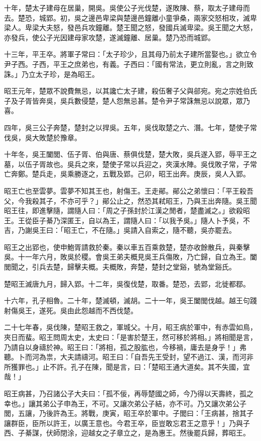 \begin{pinyinscope}
十年，楚太子建母在居巢，開吳。吳使公子光伐楚，遂敗陳、蔡，取太子建母而去。楚恐，城郢。初，吳之邊邑卑梁與楚邊邑鐘離小童爭桑，兩家交怒相攻，滅卑梁人。卑梁大夫怒，發邑兵攻鐘離。楚王聞之怒，發國兵滅卑梁。吳王聞之大怒，亦發兵，使公子光因建母家攻楚，遂滅鐘離、居巢。楚乃恐而城郢。

十三年，平王卒。將軍子常曰：「太子珍少，且其母乃前太子建所當娶也。」欲立令尹子西。子西，平王之庶弟也，有義。子西曰：「國有常法，更立則亂，言之則致誅。」乃立太子珍，是為昭王。

昭王元年，楚眾不說費無忌，以其讒亡太子建，殺伍奢子父與郤宛。宛之宗姓伯氏子及子胥皆奔吳，吳兵數侵楚，楚人怨無忌甚。楚令尹子常誅無忌以說眾，眾乃喜。

四年，吳三公子奔楚，楚封之以捍吳。五年，吳伐取楚之六、潛。七年，楚使子常伐吳，吳大敗楚於豫章。

十年冬，吳王闔閭、伍子胥、伯與唐、蔡俱伐楚，楚大敗，吳兵遂入郢，辱平王之墓，以伍子胥故也。吳兵之來，楚使子常以兵迎之，夾漢水陣。吳伐敗子常，子常亡奔鄭。楚兵走，吳乘勝逐之，五戰及郢。己卯，昭王出奔。庚辰，吳人入郢。

昭王亡也至雲夢。雲夢不知其王也，射傷王。王走鄖。鄖公之弟懷曰：「平王殺吾父，今我殺其子，不亦可乎？」鄖公止之，然恐其弒昭王，乃與王出奔隨。吳王聞昭王往，即進擊隨，謂隨人曰：「周之子孫封於江漢之閒者，楚盡滅之。」欲殺昭王。王從臣子綦乃深匿王，自以為王，謂隨人曰：「以我予吳。」隨人卜予吳，不吉，乃謝吳王曰：「昭王亡，不在隨。」吳請入自索之，隨不聽，吳亦罷去。

昭王之出郢也，使申鮑胥請救於秦。秦以車五百乘救楚，楚亦收餘散兵，與秦擊吳。十一年六月，敗吳於稷。會吳王弟夫概見吳王兵傷敗，乃亡歸，自立為王。闔閭聞之，引兵去楚，歸擊夫概。夫概敗，奔楚，楚封之堂谿，號為堂谿氏。

楚昭王滅唐九月，歸入郢。十二年，吳復伐楚，取番。楚恐，去郢，北徙都鄀。

十六年，孔子相魯。二十年，楚滅頓，滅胡。二十一年，吳王闔閭伐越。越王句踐射傷吳王，遂死。吳由此怨越而不西伐楚。

二十七年春，吳伐陳，楚昭王救之，軍城父。十月，昭王病於軍中，有赤雲如鳥，夾日而蜚。昭王問周太史，太史曰：「是害於楚王，然可移於將相。」將相聞是言，乃請自以身禱於神。昭王曰：「將相，孤之股肱也，今移禍，庸去是身乎！」弗聽。卜而河為祟，大夫請禱河。昭王曰：「自吾先王受封，望不過江、漢，而河非所獲罪也。」止不許。孔子在陳，聞是言，曰：「楚昭王通大道矣。其不失國，宜哉！」

昭王病甚，乃召諸公子大夫曰：「孤不佞，再辱楚國之師，今乃得以天壽終，孤之幸也。」讓其弟公子申為王，不可。又讓次弟公子結，亦不可。乃又讓次弟公子閭，五讓，乃後許為王。將戰，庚寅，昭王卒於軍中。子閭曰：「王病甚，捨其子讓群臣，臣所以許王，以廣王意也。今君王卒，臣豈敢忘君王之意乎！」乃與子西、子綦謀，伏師閉涂，迎越女之子章立之，是為惠王。然後罷兵歸，葬昭王。


\end{pinyinscope}
